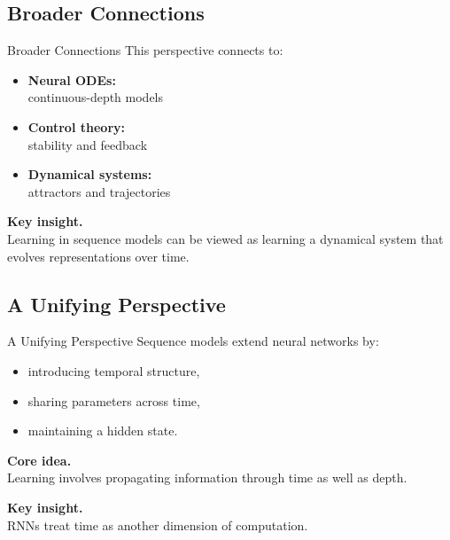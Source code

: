 \documentclass[aspectratio=169,11pt]{beamer}
\begin{document}
\subsection{Broader Connections}
\begin{frame}[t,allowframebreaks]{Broader Connections}
\small
This perspective connects to:

\begin{itemize}
    \item \textbf{Neural ODEs:}\\ continuous-depth models
    \item \textbf{Control theory:}\\ stability and feedback
    \item \textbf{Dynamical systems:}\\ attractors and trajectories
\end{itemize}

\textbf{Key insight.}\\ Learning in sequence models can be viewed as learning a dynamical system that evolves representations over time.
\end{frame}

\subsection{A Unifying Perspective}
\begin{frame}[t,allowframebreaks]{A Unifying Perspective}
\small
Sequence models extend neural networks by:

\begin{itemize}
    \item introducing temporal structure,
    \item sharing parameters across time,
    \item maintaining a hidden state.
\end{itemize}

\textbf{Core idea.}\\ Learning involves propagating information through time as well as depth.

\textbf{Key insight.}\\ RNNs treat time as another dimension of computation.
\end{frame}
\end{document}
